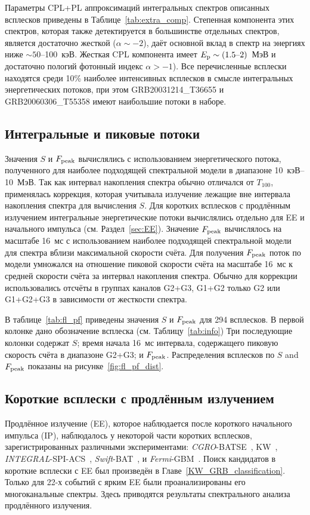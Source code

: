 Параметры CPL+PL аппроксимаций интегральных спектров описанных всплесков приведены в Таблице~\ref{tab:extra_comp}. 
Степенная компонента этих спектров, которая также детектируется в большинстве отдельных спектров,
является достаточно жесткой ($\alpha \sim -2$), даёт основной вклад в спектр на  
энергиях ниже $\sim 50$--100~кэВ.
Жесткая CPL компонента имеет $E_{\mathrm{p}}\sim(1.5\textrm{--}2)$~МэВ и достаточно пологий
фотонный индекс $\alpha > -1$).
Все перечисленные всплески находятся среди 10\% наиболее интенсивных всплесков
в смысле интегральных энергетических потоков, при этом
GRB20031214\_T36655 и GRB20060306\_T55358 имеют наибольшие потоки в наборе.

\subsection{Интегральные и пиковые потоки}
Значения $S$ и $F_{\mathrm{peak}}$ вычислялись с использованием энергетического потока,
полученного для наиболее подходящей спектральной модели в диапазоне 10~кэВ--10~МэВ.
Так как интервал накопления спектра обычно отличался от $T_{100}$, применялась 
коррекция, которая учитывала излучение лежащие вне интервала накопления спектра 
для вычисления $S$.
Для коротких всплесков с продлённым излучением интегральные энергетические потоки 
вычислялись отдельно для EE и начального импульса (см. Раздел~\ref{sec:EE}).
Значение $F_{\mathrm{peak}}$ вычислялось на масштабе 16~мс с использованием наиболее 
подходящей спектральной модели для спектра вблизи максимальной скорости счёта.
Для получения $F_{\mathrm{peak}}$ поток по модели умножался на отношение 
пиковой скорости счёта на масштабе 16~мс к средней скорости счёта за интервал 
накопления спектра. Обычно для коррекции использовались отсчёты в группах каналов
G2+G3, G1+G2 только G2 или G1+G2+G3 в зависимости от жесткости спектра.

В таблице~\ref{tab:fl_pf} приведены значения $S$ и $F_{\mathrm{peak}}$ для 294 всплесков.
В первой колонке дано обозначение всплеска (см. Таблицу~\ref{tab:info})
Три последующие колонки содержат $S$; время начала 16~мс интервала, содержащего
пиковую скорость счёта в диапазоне G2+G3; и $F_{\mathrm{peak}}$.
Распределения всплесков по $S$ and $F_{\mathrm{peak}}$ показаны на рисунке~\ref{fig:fl_pf_dist}.


\subsection{Короткие всплески с продлённым излучением}
Продлённое излучение (EE), которое наблюдается после короткого начального импульса (IP),
наблюдалось у некоторой части коротких всплесков, зарегистрированных различными экспериментами:
\textit{CGRO}-BATSE~\citep{Burenin_2000AstL, Norris_and_Bonnel_2006ApJ, Bostanci_2013MNRAS}, 
KW~\citep{Mazets_2002astroph, Frederiks_2004ASPC}, 
\textit{INTEGRAL}-SPI-ACS~\citep{Minaev_2010AstL}, 
\textit{Swift}-BAT~\citep{Norris_2011ApJ, Sakamoto_2011ApJS}, 
и \textit{Fermi}-GBM~\citep{Kaneko_2015MNRAS}. 
Поиск кандидатов в короткие всплески с EE был произведён в Главе~\ref{KW_GRB_classification}.
Только для 22-х событий с ярким EE были проанализированы его многоканальные спектры.
Здесь приводятся результаты спектрального анализа продлённого излучения.

